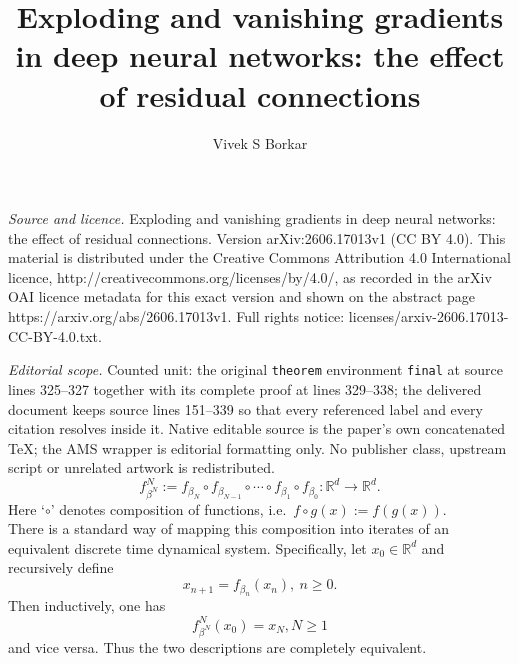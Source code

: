 \documentclass[10pt,a4paper]{amsart}
\newcommand{\R}{\mathbb{R}}
\newcommand{\0}{\textbf{0}}
\begin{document}
\title[Exploding and vanishing gradients in deep neural networks: t]{Exploding and vanishing gradients in deep neural networks: the effect of residual connections}
\author{Vivek S Borkar}
\date{}
\maketitle
\noindent\emph{Source and licence.} Exploding and vanishing gradients in deep neural networks: the effect of residual connections. Version arXiv:2606.17013v1 (CC BY 4.0). This material is distributed under the Creative Commons Attribution 4.0 International licence, http://creativecommons.org/licenses/by/4.0/, as recorded in the arXiv OAI licence metadata for this exact version and shown on the abstract page https://arxiv.org/abs/2606.17013v1. Full rights notice: licenses/arxiv-2606.17013-CC-BY-4.0.txt.\par\smallskip
\noindent\textit{Editorial scope.} Counted unit: the original \texttt{theorem} environment \texttt{final} at source lines 325--327 together with its complete proof at lines 329--338; the delivered document keeps source lines 151--339 so that every referenced label and every citation resolves inside it. Native editable source is the paper's own concatenated TeX; the AMS wrapper is editorial formatting only. No publisher class, upstream script or unrelated artwork is redistributed.
\begin{equation}
f^N_{\beta^N} := f_{\beta_N}\circ f_{\beta_{N-1}} \circ \cdots \circ f_{\beta_1} \circ f_{\beta_0} : \R^d \to \R^d. \label{DNNmap}
\end{equation}
Here `$\circ$' denotes composition of functions, i.e.\ $f\circ g(x) := f(g(x))$. \\

There is a standard way of mapping this composition into iterates of an equivalent discrete time dynamical system. Specifically, let $x_0 \in \R^d$ and recursively define 
\begin{equation}
x_{n+1} = f_{\beta_n}(x_n), \ n \geq 0. \label{dynamics0}
\end{equation}
Then inductively, one has
$$f^N_{\beta^N}(x_0) = x_N, N \geq 1$$
and vice versa. Thus the two descriptions are completely equivalent.\\
\end{document}
